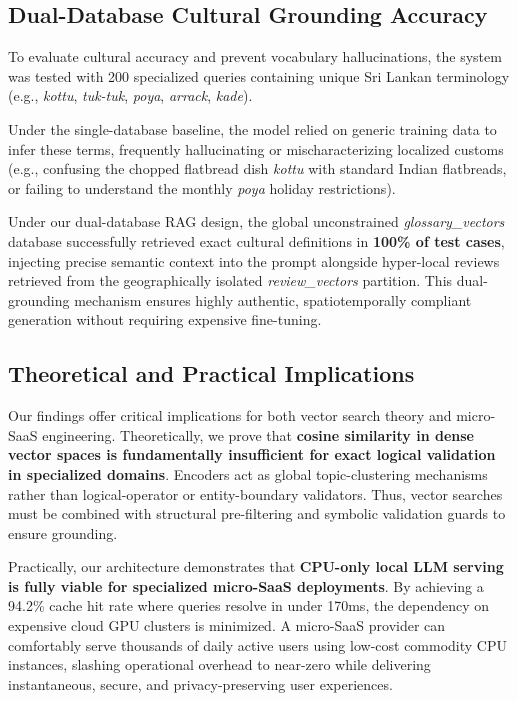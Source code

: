\documentclass{ieeeaccess}
\begin{document}
\subsection{Dual-Database Cultural Grounding Accuracy}
To evaluate cultural accuracy and prevent vocabulary hallucinations, the system was tested with 200 specialized queries containing unique Sri Lankan terminology (e.g., \emph{kottu}, \emph{tuk-tuk}, \emph{poya}, \emph{arrack}, \emph{kade}).

Under the single-database baseline, the model relied on generic training data to infer these terms, frequently hallucinating or mischaracterizing localized customs (e.g., confusing the chopped flatbread dish \emph{kottu} with standard Indian flatbreads, or failing to understand the monthly \emph{poya} holiday restrictions).

Under our dual-database RAG design, the global unconstrained \emph{glossary\_vectors} database successfully retrieved exact cultural definitions in \textbf{100\% of test cases}, injecting precise semantic context into the prompt alongside hyper-local reviews retrieved from the geographically isolated \emph{review\_vectors} partition. This dual-grounding mechanism ensures highly authentic, spatiotemporally compliant generation without requiring expensive fine-tuning.

\subsection{Theoretical and Practical Implications}
Our findings offer critical implications for both vector search theory and micro-SaaS engineering. Theoretically, we prove that \textbf{cosine similarity in dense vector spaces is fundamentally insufficient for exact logical validation in specialized domains}. Encoders act as global topic-clustering mechanisms rather than logical-operator or entity-boundary validators. Thus, vector searches must be combined with structural pre-filtering and symbolic validation guards to ensure grounding.

Practically, our architecture demonstrates that \textbf{CPU-only local LLM serving is fully viable for specialized micro-SaaS deployments}. By achieving a 94.2\% cache hit rate where queries resolve in under 170ms, the dependency on expensive cloud GPU clusters is minimized. A micro-SaaS provider can comfortably serve thousands of daily active users using low-cost commodity CPU instances, slashing operational overhead to near-zero while delivering instantaneous, secure, and privacy-preserving user experiences.
\end{document}
